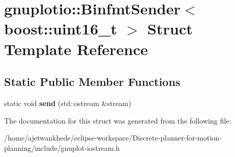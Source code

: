 \hypertarget{structgnuplotio_1_1BinfmtSender_3_01boost_1_1uint16__t_01_4}{}\section{gnuplotio\+:\+:Binfmt\+Sender$<$ boost\+:\+:uint16\+\_\+t $>$ Struct Template Reference}
\label{structgnuplotio_1_1BinfmtSender_3_01boost_1_1uint16__t_01_4}
\subsection*{Static Public Member Functions}
\begin{DoxyCompactItemize}
\item 
\mbox{\label{structgnuplotio_1_1BinfmtSender_3_01boost_1_1uint16__t_01_4_a7bb7f0a62a21496b9e85ce35f0170717}} 
static void {\bfseries send} (std\+::ostream \&stream)
\end{DoxyCompactItemize}


The documentation for this struct was generated from the following file\+:\begin{DoxyCompactItemize}
\item 
/home/ajetwankhede/eclipse-\/workspace/\+Discrete-\/planner-\/for-\/motion-\/planning/include/gnuplot-\/iostream.\+h\end{DoxyCompactItemize}
